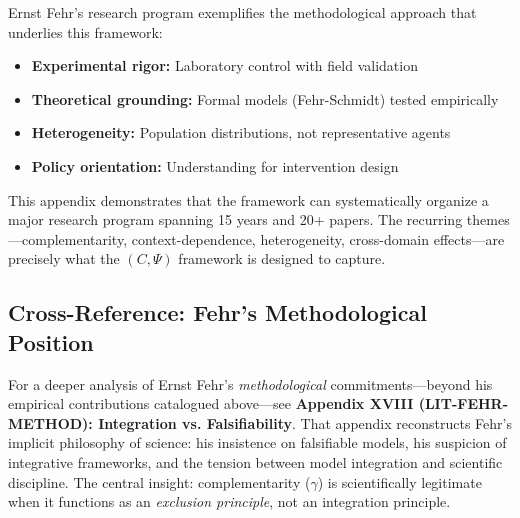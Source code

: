 Ernst Fehr's research program exemplifies the methodological approach
that underlies this framework:
\begin{itemize}
  \item \textbf{Experimental rigor:} Laboratory control with field validation
  \item \textbf{Theoretical grounding:} Formal models (Fehr-Schmidt) tested empirically
  \item \textbf{Heterogeneity:} Population distributions, not representative agents
  \item \textbf{Policy orientation:} Understanding for intervention design
\end{itemize}

This appendix demonstrates that the framework can systematically organize
a major research program spanning 15 years and 20+ papers. The recurring
themes---complementarity, context-dependence, heterogeneity, cross-domain
effects---are precisely what the $(C, \Psi)$ framework is designed to capture.

\subsection{Cross-Reference: Fehr's Methodological Position}

For a deeper analysis of Ernst Fehr's \textit{methodological} commitments---beyond
his empirical contributions catalogued above---see \textbf{Appendix XVIII (LIT-FEHR-METHOD):
Integration vs. Falsifiability}. That appendix reconstructs Fehr's implicit philosophy
of science: his insistence on falsifiable models, his suspicion of integrative frameworks,
and the tension between model integration and scientific discipline. The central insight:
complementarity ($\gamma$) is scientifically legitimate when it functions as an
\textit{exclusion principle}, not an integration principle.

